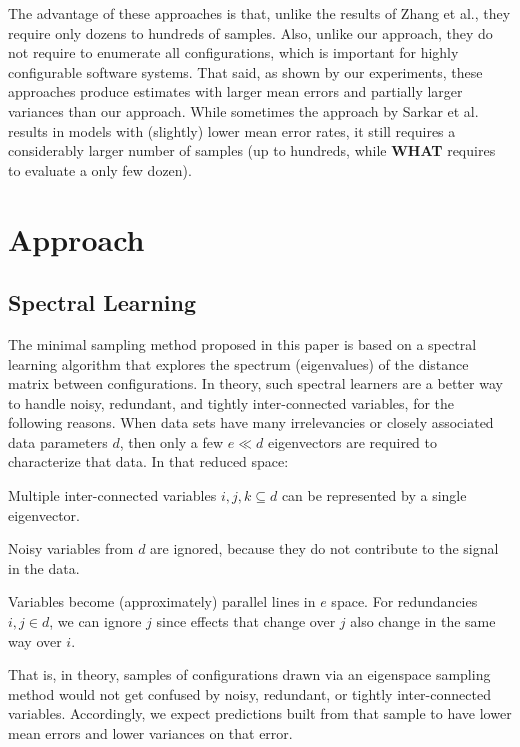 \documentclass{newsig}
\newcommand{\what}{{\bf WHAT }}
\begin{document}
The advantage of these approaches is that, unlike  the results of Zhang et al., they require only dozens to hundreds of samples. Also, unlike our approach, they do not require to enumerate all configurations, which is important for highly configurable software systems. 
That said, as shown by our experiments, these approaches produce estimates with  larger mean errors and partially larger variances than our approach. While sometimes the approach by Sarkar et al. results in  models with (slightly)
lower mean error rates, it still requires a considerably larger number of samples (up to hundreds, while \what requires to evaluate a only few dozen).
 
 \section{Approach}

\subsection{Spectral Learning}\label{sect:spect}

The minimal sampling method proposed in this paper is based on a spectral learning algorithm
that  explores the spectrum (eigenvalues) of the distance matrix between  configurations.
In theory, such spectral learners are a better way to handle noisy, redundant, and tightly inter-connected variables, for the following reasons.
When data sets have many irrelevancies or closely associated data parameters $d$, then
only a few $e \ll d$ eigenvectors are required to characterize that data.
In that reduced space:
\begin{compactitem}
\item
Multiple inter-connected variables $i,j,k \subseteq d$ can be represented
by a single eigenvector.
\item
Noisy variables from $d$ are
ignored, because they  do not contribute to the signal in the data.
\item
Variables  become (approximately) parallel lines
in $e$ space. For  redundancies \mbox{$i,j \in d$}, we
can ignore $j$
since effects that change over $j$ also
change in the same way over $i$.
\end{compactitem}
That is, in theory, samples of configurations drawn via an eigenspace sampling method
would not get confused by noisy, redundant, or tightly inter-connected variables. Accordingly,
we expect predictions built from that sample to have  lower mean errors and lower variances on that error.
\end{document}

